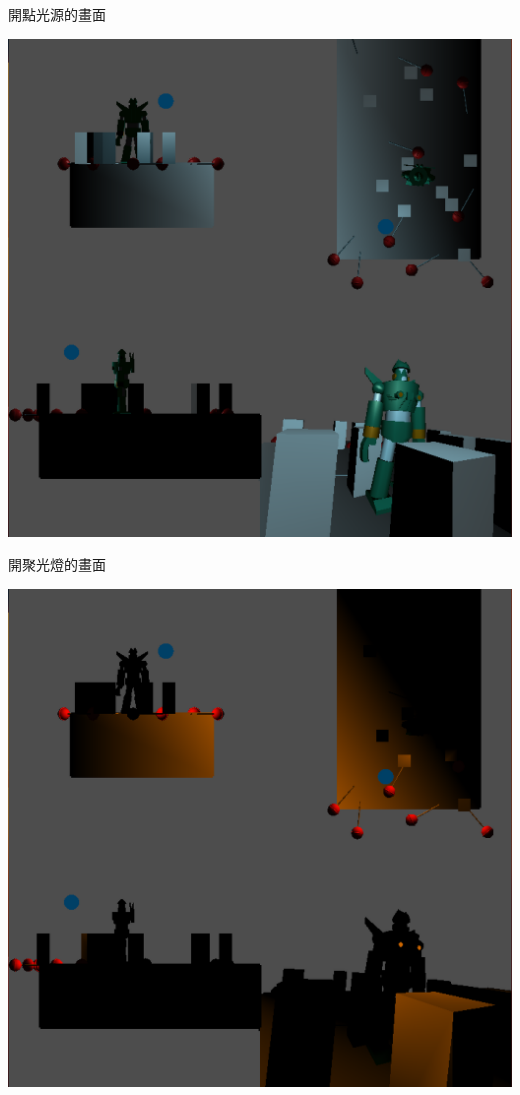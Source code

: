\documentclass[a4,12pt]{article}
\begin{document}
    \begin{multicols}{2}

        開點光源的畫面

        \includegraphics[scale=0.28]{pic2.png}

        \columnbreak

        開聚光燈的畫面

        \includegraphics[scale=0.28]{pic3.png}

    \end{multicols}
\end{document}

